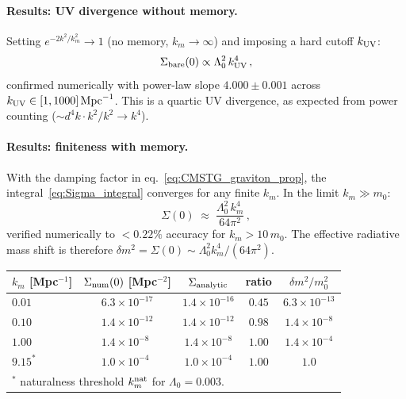 \documentclass[12pt,a4paper]{article}
\begin{document}
\paragraph{Results: UV divergence without memory.}
Setting $e^{-2k^2/k_m^2} \to 1$ (no memory, $k_m \to \infty$) and
imposing a hard cutoff $k_{\rm UV}$:
\begin{equation}
\Sigma_{\rm bare}(0) \propto \Lambda_0^2\,k_{\rm UV}^4\,,
\end{equation}
confirmed numerically with power-law slope $4.000 \pm 0.001$ across
$k_{\rm UV} \in [1, 1000]\,\mathrm{Mpc}^{-1}$.
This is a quartic UV divergence, as expected from power counting
($\sim d^4k \cdot k^2/k^2 \to k^4$).

\paragraph{Results: finiteness with memory.}
With the damping factor in eq.~\eqref{eq:CMSTG_graviton_prop}, the
integral~\eqref{eq:Sigma_integral} converges for any finite $k_m$.
In the limit $k_m \gg m_0$:
\begin{equation}
\Sigma(0) \;\approx\; \frac{\Lambda_0^2\,k_m^4}{64\pi^2}\,,
\label{eq:Sigma_analytic}
\end{equation}
verified numerically to $<0.22\%$ accuracy for $k_m > 10\,m_0$.
The effective radiative mass shift is therefore
$\delta m^2 = \Sigma(0) \sim \Lambda_0^2 k_m^4 / (64\pi^2)$.

\begin{center}
\begin{tabular}{lcccc}
\toprule
$k_m$ [Mpc$^{-1}$] & $\Sigma_{\rm num}(0)$ [Mpc$^{-2}$] & $\Sigma_{\rm analytic}$ & ratio & $\delta m^2/m_0^2$ \\
\midrule
$0.01$ & $6.3\times10^{-17}$ & $1.4\times10^{-16}$ & $0.45$ & $6.3\times10^{-13}$ \\
$0.10$ & $1.4\times10^{-12}$ & $1.4\times10^{-12}$ & $0.98$ & $1.4\times10^{-8}$ \\
$1.00$ & $1.4\times10^{-8\phantom{0}}$  & $1.4\times10^{-8}$  & $1.00$ & $1.4\times10^{-4}$ \\
$9.15^*$ & $1.0\times10^{-4\phantom{0}}$  & $1.0\times10^{-4}$  & $1.00$ & $1.0$ \\
\bottomrule
\multicolumn{5}{l}{\footnotesize $^*$ naturalness threshold $k_m^{\rm nat}$ for $\Lambda_0=0.003$.}
\end{tabular}
\end{center}
\end{document}
